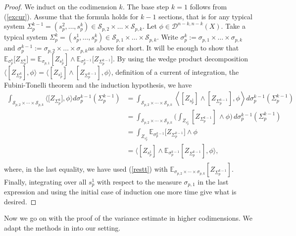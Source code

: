 \documentclass[11pt,leqno,oneside]{amsart}
\numberwithin{equation}{section}
\begin{document}
\begin{proof}

	
	We induct on the codimension $k.$ The base step $k=1$ follows from (\ref{excur}). Assume that the formula holds for $k-1$ sections, that is for any typical system $\Sigma^{k-1}_{p}=(s_{p}^{2},\dots,s_{p}^{k}) \in \mathcal{S}_{p, 2} \times \ldots \times \mathcal{S}_{p, k}$. Let $\phi \in \mathcal{D}^{n-k, n-k}(X)$. Take a typical system $\Sigma^{k}_{p}=(s_{p}^{1}, \dots, s_{p}^{k}) \in \mathcal{S}_{p, 1} \times \ldots \times \mathcal{S}_{p, k}$. Write $\sigma^{k}_{p}:= \sigma_{p, 1} \times \ldots \times \sigma_{p, k}$ and $\sigma^{k-1}_{p}:= \sigma_{p, 2} \times \ldots \times \sigma_{p, k}$as above for short. It will be enough to show that $ \mathbb{E}_{\sigma^{k}_{p}}\big[Z_{\Sigma^{k}_{p}}\big]=\mathbb{E}_{\sigma_{p, 1}}[Z_{s^1_{p}}] \wedge  \mathbb{E}_{\sigma^{k-1}_{p}}\big[Z_{\Sigma^{k-1}_{p}}\big]$. By using the wedge product decomposition $\langle [Z_{\Sigma^{k}_{p}}], \phi \rangle =\langle [Z_{s^{1}_{p}}] \wedge [Z_{\Sigma^{k-1}_{p}}], \phi \rangle$, definition of a current of integration, the Fubini-Tonelli theorem and the induction hypothesis, we have
	\begin{align*}
		\int_{\mathcal{S}_{p, 2} \times \cdots \times \mathcal{S}_{p, k}}\big \langle \big[Z_{\Sigma_{p}^{k}}\big], \phi \big \rangle d\sigma^{k-1}_{p}(\Sigma_{p}^{k-1})&=\int_{\mathcal{S}_{p, 2} \times \cdots \times \mathcal{S}_{p, k}}\left \langle [Z_{s_{p}^{1}}] \wedge [Z_{\Sigma_{p}^{k-1}}], \phi \right \rangle d\sigma^{k-1}_{p}(\Sigma_{p}^{k-1})\\
		&= \int_{\mathcal{S}_{p, 2} \times \cdots \times \mathcal{S}_{p, k}} \big(\int_{Z_{s_{p}^{1}}} { [Z_{\Sigma_{p}^{k-1}}]} \,\wedge \phi \big) \, d\sigma_{p}^{k-1}(\Sigma_{p}^{k-1})   \\
		&=\int_{Z_{s^{1}_{p}}}{\mathbb{E}_{\sigma^{k-1}_{p}}\big[Z_{\Sigma^{k-1}_{p}}\big] \wedge \phi}\\
        &=\big \langle [Z_{s_{p}^{1}}] \wedge \mathbb{E}_{\sigma^{k-1}_{p}}[Z_{\Sigma_{p}^{k-1}}], \phi \big \rangle, \nonumber \\
	\end{align*}where, in the last equality, we have used (\ref{restt}) with $\mathbb{E}_{\sigma_{p, 2} \times \cdots \times \sigma_{p, k}}[Z_{\Sigma^{k-1}_{p}}]$. Finally, integrating over all $s_{p}^{1}$ with respect to the measure $\sigma_{p, 1}$ in the last expression and using the initial case of induction one more time give what is desired.

\end{proof} Now we go on with the proof of the variance estimate in higher codimensions. We adapt the methods in \cite[Theorem 3.1]{Shif} into our setting.
\end{document}
